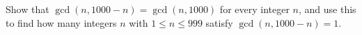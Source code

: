 Show that $\gcd(n,1000-n)=\gcd(n,1000)$ for every integer $n$, and use this to find how many integers $n$ with $1\le n\le999$ satisfy $\gcd(n,1000-n)=1$.

